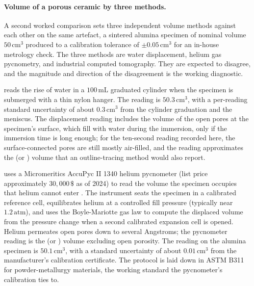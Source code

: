 \paragraph{Volume of a porous ceramic by three methods.}
A second worked comparison sets three independent volume methods
against each other on the same artefact, a sintered alumina specimen
of nominal volume $50 \,\si{\centi\meter\cubed}$ produced to a
calibration tolerance of $\pm 0.05 \,\si{\centi\meter\cubed}$ for an
in-house metrology check. The three methods are water displacement,
helium gas pycnometry, and industrial computed tomography. They are
expected to disagree, and the magnitude and direction of the
disagreement is the working diagnostic.

 reads the rise of water in a
$100 \,\si{\milli\liter}$ graduated cylinder when the specimen is
submerged with a thin nylon hanger. The reading is $50.3 \,\si{
\centi\meter\cubed}$, with a per-reading standard uncertainty of
about $0.3 \,\si{\centi\meter\cubed}$ from the cylinder graduation
and the meniscus. The displacement reading includes the volume of
the open pores at the specimen's surface, which fill with water
during the immersion, only if the immersion time is long enough; for
the ten-second reading recorded here, the surface-connected pores
are still mostly air-filled, and the reading approximates the
 (or ) volume that an outline-tracing
method would also report.

 uses a Micromeritics AccuPyc II 1340 helium
pycnometer (list price approximately $30{,}000 \,\$ $ as of 2024)
to read the volume the specimen occupies that helium cannot enter
\cite{ch07t3b-web:micromeritics-accupyc-1340}. The instrument
seats the specimen in a calibrated reference cell, equilibrates
helium at a controlled fill pressure (typically near
$1.2 \,\text{atm}$), and uses the Boyle-Mariotte gas law to compute
the displaced volume from the pressure change when a second
calibrated expansion cell is opened. Helium permeates open pores
down to several Angstroms; the pycnometer reading is the
 (or ) volume excluding open
porosity. The reading on the alumina specimen is $50.1 \,\si{
\centi\meter\cubed}$, with a standard uncertainty of about
$0.01 \,\si{\centi\meter\cubed}$ from the manufacturer's calibration
certificate. The protocol is laid down in ASTM B311
\cite{ch07t3b-std:astm-b311-2022} for powder-metallurgy materials,
the working standard the pycnometer's calibration ties to.

